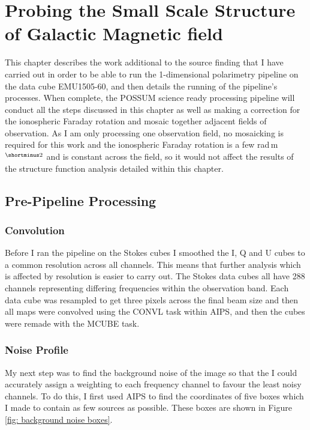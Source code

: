\chapter{Probing the Small Scale Structure of Galactic Magnetic field}
\label{ch: RMsynth}

This chapter describes the work additional to the source finding that I have carried out in order to be able to run the 1-dimensional polarimetry pipeline on the data cube EMU1505-60, and then details the running of the pipeline's processes. When complete, the POSSUM science ready processing pipeline will conduct all the steps discussed in this chapter as well as making a correction for the ionospheric Faraday rotation and mosaic together adjacent fields of observation. As I am only processing one observation field, no mosaicking is required for this work and the ionospheric Faraday rotation is a few rad$\,$m$^{\shortminus2}$ and is constant across the field, so it would not affect the results of the structure function analysis detailed within this chapter. 

\section{Pre-Pipeline Processing}

\subsection{Convolution}

Before I ran the pipeline on the Stokes cubes I smoothed the I, Q and U cubes to a common resolution across all channels. This means that further analysis which is affected by resolution is easier to carry out. The Stokes data cubes all have 288 channels representing differing frequencies within the observation band. Each data cube was resampled to get three pixels across the final beam size and then all maps were convolved using the CONVL task within AIPS, and then the cubes were remade with the MCUBE task.

\subsection{Noise Profile}

My next step was to find the background noise of the image so that the I could accurately assign a weighting to each frequency channel to favour the least noisy channels. To do this, I first used AIPS to find the coordinates of five boxes which I made to contain as few sources as possible. These boxes are shown in Figure \ref{fig: background noise boxes}.

